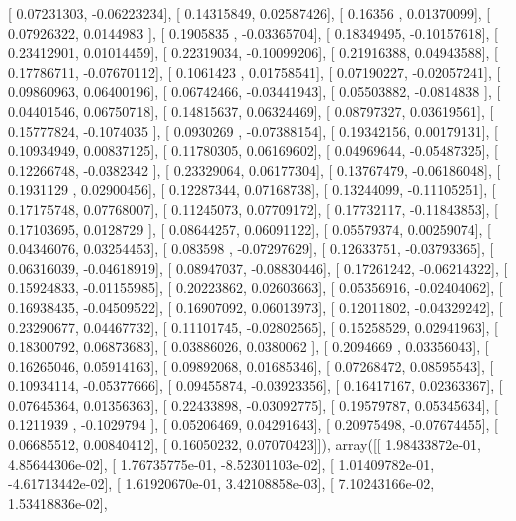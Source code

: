 \documentclass{article}
\begin{document}
       [ 0.07231303, -0.06223234],
       [ 0.14315849,  0.02587426],
       [ 0.16356   ,  0.01370099],
       [ 0.07926322,  0.0144983 ],
       [ 0.1905835 , -0.03365704],
       [ 0.18349495, -0.10157618],
       [ 0.23412901,  0.01014459],
       [ 0.22319034, -0.10099206],
       [ 0.21916388,  0.04943588],
       [ 0.17786711, -0.07670112],
       [ 0.1061423 ,  0.01758541],
       [ 0.07190227, -0.02057241],
       [ 0.09860963,  0.06400196],
       [ 0.06742466, -0.03441943],
       [ 0.05503882, -0.0814838 ],
       [ 0.04401546,  0.06750718],
       [ 0.14815637,  0.06324469],
       [ 0.08797327,  0.03619561],
       [ 0.15777824, -0.1074035 ],
       [ 0.0930269 , -0.07388154],
       [ 0.19342156,  0.00179131],
       [ 0.10934949,  0.00837125],
       [ 0.11780305,  0.06169602],
       [ 0.04969644, -0.05487325],
       [ 0.12266748, -0.0382342 ],
       [ 0.23329064,  0.06177304],
       [ 0.13767479, -0.06186048],
       [ 0.1931129 ,  0.02900456],
       [ 0.12287344,  0.07168738],
       [ 0.13244099, -0.11105251],
       [ 0.17175748,  0.07768007],
       [ 0.11245073,  0.07709172],
       [ 0.17732117, -0.11843853],
       [ 0.17103695,  0.0128729 ],
       [ 0.08644257,  0.06091122],
       [ 0.05579374,  0.00259074],
       [ 0.04346076,  0.03254453],
       [ 0.083598  , -0.07297629],
       [ 0.12633751, -0.03793365],
       [ 0.06316039, -0.04618919],
       [ 0.08947037, -0.08830446],
       [ 0.17261242, -0.06214322],
       [ 0.15924833, -0.01155985],
       [ 0.20223862,  0.02603663],
       [ 0.05356916, -0.02404062],
       [ 0.16938435, -0.04509522],
       [ 0.16907092,  0.06013973],
       [ 0.12011802, -0.04329242],
       [ 0.23290677,  0.04467732],
       [ 0.11101745, -0.02802565],
       [ 0.15258529,  0.02941963],
       [ 0.18300792,  0.06873683],
       [ 0.03886026,  0.0380062 ],
       [ 0.2094669 ,  0.03356043],
       [ 0.16265046,  0.05914163],
       [ 0.09892068,  0.01685346],
       [ 0.07268472,  0.08595543],
       [ 0.10934114, -0.05377666],
       [ 0.09455874, -0.03923356],
       [ 0.16417167,  0.02363367],
       [ 0.07645364,  0.01356363],
       [ 0.22433898, -0.03092775],
       [ 0.19579787,  0.05345634],
       [ 0.1211939 , -0.1029794 ],
       [ 0.05206469,  0.04291643],
       [ 0.20975498, -0.07674455],
       [ 0.06685512,  0.00840412],
       [ 0.16050232,  0.07070423]]), array([[  1.98433872e-01,   4.85644306e-02],
       [  1.76735775e-01,  -8.52301103e-02],
       [  1.01409782e-01,  -4.61713442e-02],
       [  1.61920670e-01,   3.42108858e-03],
       [  7.10243166e-02,   1.53418836e-02],
\end{document}
